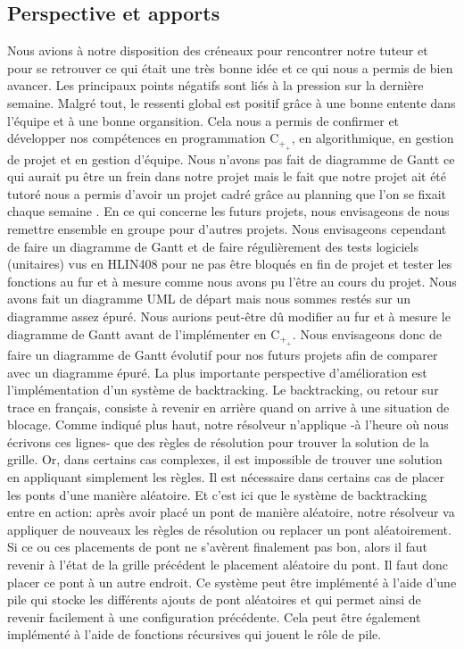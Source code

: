\documentclass[french]{article}
\begin{document}
    \subsection{\Large Perspective et apports}
    \hspace{0.5cm} Nous avions à notre disposition des créneaux pour rencontrer notre tuteur et pour se retrouver ce qui était une très bonne idée et ce qui nous a permis de bien avancer. \newline
    Les principaux points négatifs sont liés à la pression sur la dernière semaine.  Malgré tout, le ressenti global est positif grâce à une bonne entente dans l'équipe et à une bonne organsition. Cela nous a permis de confirmer et développer nos compétences en programmation C$_+_+$, en algorithmique, en gestion de projet et en gestion d'équipe.
    Nous n'avons pas fait de diagramme de Gantt ce qui aurait pu être un frein dans notre projet mais le fait que notre projet ait été tutoré nous a permis d'avoir un projet cadré grâce au planning que l'on se fixait chaque semaine .
    En ce qui concerne les futurs projets, nous envisageons de nous remettre ensemble en groupe pour d'autres projets. Nous envisageons cependant de faire un diagramme de Gantt et de faire régulièrement des tests logiciels (unitaires) vus en HLIN408 pour ne pas être bloqués en fin de projet et tester les fonctions au fur et à mesure comme nous avons pu l'être au cours du projet. Nous avons fait un diagramme UML de départ mais nous sommes restés sur un diagramme assez épuré. Nous aurions peut-être dû modifier au fur et à mesure le diagramme de Gantt avant de l'implémenter en C$_+_+$. Nous envisageons donc de faire un diagramme de Gantt évolutif pour nos futurs projets afin de comparer avec un diagramme épuré.
    \newline
    La plus importante perspective d'amélioration est l'implémentation d'un système de backtracking. Le backtracking, ou retour sur trace en français, consiste à revenir en arrière quand on arrive à une situation de blocage. Comme indiqué plus haut, notre résolveur n'applique -à l'heure où nous écrivons ces lignes- que des règles de résolution pour trouver la solution de la grille. Or, dans certains cas complexes, il est impossible de trouver une solution en appliquant simplement les règles. Il est nécessaire dans certains cas de placer les ponts d'une manière aléatoire. Et c'est ici que le système de backtracking entre en action: après avoir placé un pont de manière aléatoire, notre résolveur va appliquer de nouveaux les règles de résolution ou replacer un pont aléatoirement. Si ce ou ces placements de pont ne s'avèrent finalement pas bon, alors il faut revenir à l'état de la grille précédent le placement aléatoire du pont. Il faut donc placer ce pont à un autre endroit. Ce système peut être implémenté à l'aide d'une pile qui stocke les différents ajouts de pont aléatoires et qui permet ainsi de revenir facilement à une configuration précédente. Cela peut être également implémenté à l'aide de fonctions récursives qui jouent le rôle de pile. 
\end{document}
